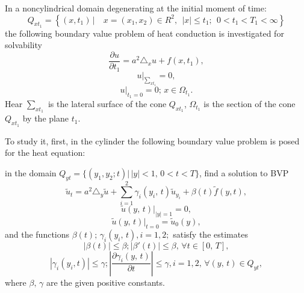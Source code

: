 
\vzmscaption

In a noncylindrical domain degenerating at the initial moment of time:
$$
Q_{xt_{1}}=\left\{(x,t_{1})\,\Big|\quad x=(x_{1}, x_{2})\in R^{2},\; \,|x|\leq t_{1}; \; \,
0< t_{1}<T_{1}<\infty \right\}
$$
the following boundary value problem of heat conduction is investigated for solvability
\begin{equation}\label{32-1}
\frac{\partial u}{\partial t_1}=a^{2}\triangle_x u+f(x,t_{1}),
\end{equation}
\begin{equation}\label{33-1}
u|_{\sum_{xt_{1}}}=0,
\end{equation}
\begin{equation}\label{34-1}
u|_{t_{1}=0}=0;\, x\in\Omega_{t_{1}}.
\end{equation}
Hear $\sum_{xt_{1}}$ is the lateral surface of the cone $Q_{xt_{1}}$,
$\Omega_{t_{1}}$ is the section of the cone $Q_{xt_{1}}$ by the plane  $t_{1}$.

To study it, first, in the cylinder the following boundary value problem is posed for the heat equation:

in the domain $Q_{yt}=\{(y_{1}, y_{2}; t) | \, |y|<1, \, 0<t<T \}$,  find a solution to BVP
\begin{equation}\label{7}
\tilde{u}_{t}=a^{2}\triangle_{y}\tilde{u}+\sum_{i=1}^{2}\gamma_{i}(y_{i},\,t)\tilde{u}_{y_{i}}+\beta(t)\tilde{f}(y,t),
\end{equation}
\begin{equation}\label{5}
\tilde{u}(y,\,t)|_{|y|=1}=0,
\end{equation}
\begin{equation}\label{6}
\tilde{u}(y,\,t)|_{t=0}=\tilde{u}_{0}(y),
\end{equation}
and the functions $\beta(t);\,\gamma_{i}(y_{i},\,t),i=1,2;$
satisfy the estimates
\begin{equation}\label{6-1}
|\beta(t)|\leq \beta; |\beta'(t)|\leq\beta, \, {\forall t\in[0,\,T]},
\end{equation}
\begin{equation}\label{6-2}
|\gamma_{i}(y_{i}, t)|\leq\gamma; \left|\frac{\partial \gamma_{i}(y,\,t)}{\partial t}\right|\leq\gamma, i=1,2,\, \forall(y,\,t)\in Q_{yt},
\end{equation}
where $\beta,\, \gamma$ are the given positive constants.

